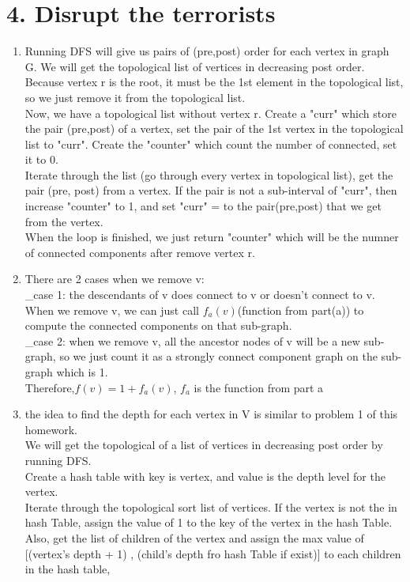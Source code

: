 \documentclass[11pt]{article}
\newenvironment{qparts}{\begin{enumerate}[{(}a{)}]}{\end{enumerate}}
\begin{document}
\newpage
\section*{4. Disrupt the terrorists}
\begin{qparts}
\item
Running DFS will give us pairs of (pre,post) order for each vertex in graph G. We will get the topological list of vertices in decreasing post order. Because vertex r is the root, it must be the 1st element in the topological list, so we just remove it from the topological list.\\
Now, we have a topological list without vertex r. Create a "curr" which store the pair (pre,post) of a vertex, set the pair of the 1st vertex in the topological list to "curr". Create the "counter" which count the number of connected, set it to 0.\\
Iterate through the list (go through every vertex in topological list), get the pair (pre, post) from a vertex. If the pair is not a sub-interval of "curr", then increase "counter" to 1, and set "curr" = to the pair(pre,post) that we get from the vertex.\\
When the loop is finished, we just return "counter" which will be the numner of connected components after remove vertex r.
\item
There are 2 cases when we remove v: \\
\_case 1: the descendants of v does connect to v or doesn't connect to v. When we remove v, we can just call $f_a(v)$(function from part(a)) to compute the connected components on that sub-graph.\\
\_case 2: when we remove v, all the ancestor nodes of v will be a new sub-graph, so we just count it as a strongly connect component graph on the sub-graph which is 1.\\
Therefore,$\boxed{f(v) = 1 + f_a(v)}$, $f_a$ is the function from part a

\item
the idea to find the depth for each vertex in V is similar to problem 1 of this homework.\\
We will get the topological of a list of vertices in decreasing post order by running DFS.\\
Create a hash table with key is vertex, and value is the depth level for the vertex.\\
Iterate through the topological sort list of vertices. If the vertex is not the in hash Table, assign the value of 1 to the key of the vertex in the hash Table. Also, get the list of children of the vertex and assign the max value of [(vertex's depth + 1) , (child's depth fro hash Table if exist)]  to each children in the hash table, \\


\end{qparts}
\end{document}
